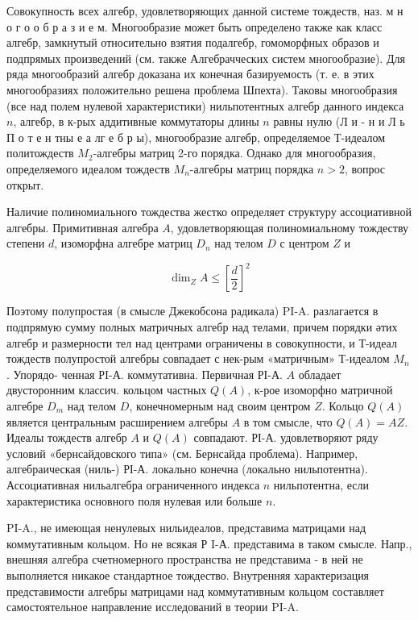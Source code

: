 \documentclass[10pt]{article}
\begin{document}
Совокупность всех алгебр, удовлетворяющих данной системе тождеств, наз. м н о г о о б р а з и е м. Многообразие может быть определено также как класс алгебр, замкнутый относительно взятия подалгебр, гомоморфных образов и подпрямых произведений (см. также Алгебрачческих систем многообразие). Для ряда многообразий алгебр доказана их конечная базируемость (т. е. в этих многообразиях положительно решена проблема Шпехта). Таковы многообразия (все над полем нулевой характеристики) нильпотентных алгебр данного индекса $n$, алгебр, в к-рых аддитивные коммутаторы длины $n$ равны нулю (Л и - н и Л ь П о т е н тны е а лг е б р ы), многообразие алгебр, определяемое Т-идеалом политождеств $M_{2}$-алгебры матриц 2-го порядка. Однако для многообразия, определяемого идеалом тождеств $M_{n}$-алгебры матриц порядка $n>2$, вопрос открыт.



Наличие полиномиального тождества жестко определяет структуру ассоциативной алгебры. Примитивная алгебра $A$, удовлетворяющая полиномиальному тождеству степени $d$, изоморфна алгебре матриц $D_{n}$ над телом $D$ с центром $Z$ и



\[

\operatorname{dim}_{Z} A \leqslant\left[\frac{d}{2}\right]^{2}

\]



Поэтому полупростая (в смысле Джекобсона радикала) PI-A. разлагается в подпрямую сумму полных матричных алгебр над телами, причем порядки әтих алгебр и размерности тел над центрами ограничены в совокупности, и Т-идеал тождеств полупростой алгебры совпадает с нек-рым «матричным» Т-идеалом $M_{n}$. Упорядо- ченная РI-А. коммутативна. Первичная РІ-А. $A$ обладает двусторонним классич. кольцом частных $Q(A)$, к-рое изоморфно матричной алгебре $D_{m}$ над телом $D$, конечномерным над своим центром $Z$. Кольцо $Q(A)$ является центральным расширением алгебры $A$ в том смысле, что $Q(A)=A Z$. Идеалы тождеств алгебр $A$ и $Q(A)$ совпадают. РІ-А. удовлетворяют ряду условий «бернсайдовского типа» (см. Бернсайда проблема). Например, алгебраическая (ниль-) РІ-А. локально конечна (локально нильпотентна). Ассоциативная нильалгебра ограниченного индекса $n$ нильпотентна, если характеристика основного поля нулевая или больше $n$.



PI-A., не имеющая ненулевых нильидеалов, представима матрицами над коммутативным кольцом. Но не всякая Р I-А. представима в таком смысле. Напр., внешняя алгебра счетномерного пространства не представима - в ней не выполняется никакое стандартное тождество. Внутренняя характеризация представимости алгебры матрицами над коммутативным кольцом составляет самостоятельное направление исследований в теории PI-A.
\end{document}
